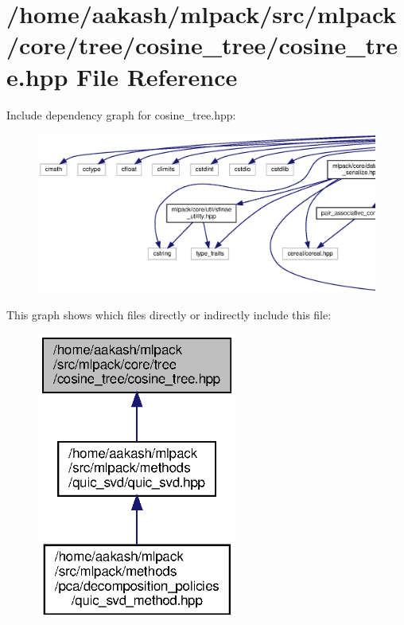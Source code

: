 \section{/home/aakash/mlpack/src/mlpack/core/tree/cosine\+\_\+tree/cosine\+\_\+tree.hpp File Reference}
\label{cosine__tree_8hpp}
Include dependency graph for cosine\+\_\+tree.\+hpp\+:
\nopagebreak
\begin{figure}[H]
\begin{center}
\leavevmode
\includegraphics[width=350pt]{cosine__tree_8hpp__incl}
\end{center}
\end{figure}
This graph shows which files directly or indirectly include this file\+:
\nopagebreak
\begin{figure}[H]
\begin{center}
\leavevmode
\includegraphics[width=186pt]{cosine__tree_8hpp__dep__incl}
\end{center}
\end{figure}
